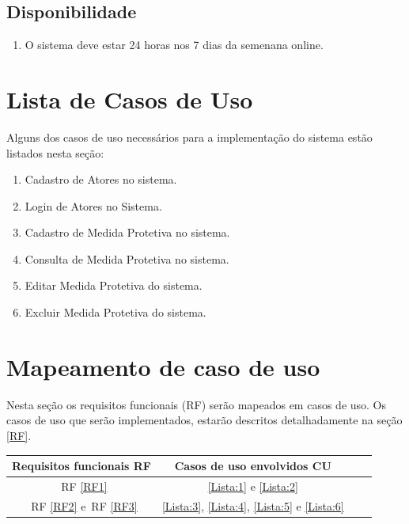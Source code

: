 \documentclass[
	12pt,				%
    oneside,			%
	a4paper,			%
	english,			%
	french,				%
	spanish,			%
	brazil,				%
	]{abntex2}
\begin{document}
\subsection{Disponibilidade}\label{sec:RFN04}
\begin{enumerate}
	\item O sistema deve estar 24 horas nos 7 dias da semenana online.
\end{enumerate}
\section{Lista de Casos de Uso}
Alguns dos casos de uso necessários para a implementação do sistema estão listados nesta seção:
\begin{enumerate}
	\item Cadastro de Atores no sistema. \label{Lista:1}
	\item Login de Atores no Sistema.\label{Lista:2}
	\item Cadastro de Medida Protetiva no sistema.\label{Lista:3}
	\item Consulta de Medida Protetiva no sistema.\label{Lista:4}
	\item Editar Medida Protetiva do sistema.\label{Lista:5}
	\item Excluir Medida Protetiva do sistema.\label{Lista:6}
\end{enumerate}
\section{Mapeamento de caso de uso}
Nesta seção os requisitos funcionais (RF) serão mapeados em casos de uso. Os casos de uso que serão implementados, estarão descritos detalhadamente na seção \ref{RF}.

\begin{center}
	\begin{tabular}{ |c|c|c|c| } 
		\hline
		Requisitos funcionais
		RF  & Casos de uso envolvidos
		CU \\
		\hline
		~RF \ref{RF1} & \ref{Lista:1} e \ref{Lista:2} \\ 
		\hline
		~RF \ref{RF2}  e~RF  \ref{RF3} & \ref{Lista:3}, \ref{Lista:4}, \ref{Lista:5} e \ref{Lista:6}   \\ 
		\hline
		
	\end{tabular}
\end{center}
\end{document}
